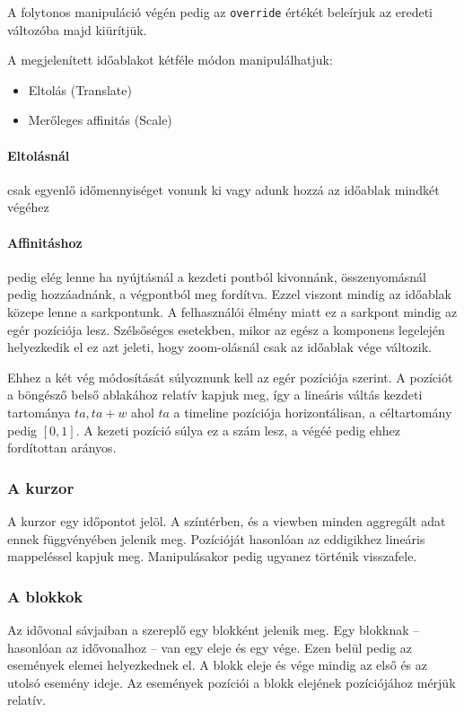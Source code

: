 A folytonos manipuláció végén pedig az \lstinline[columns=fixed]{override} értékét beleírjuk az eredeti változóba majd kiürítjük.


A megjelenített időablakot kétféle módon manipulálhatjuk:

\begin{itemize}
	\item Eltolás (Translate)
	\item Merőleges affinitás (Scale)
\end{itemize}

\paragraph{Eltolásnál} csak egyenlő időmennyiséget vonunk ki vagy adunk hozzá az időablak mindkét végéhez

\paragraph{Affinitáshoz} pedig elég lenne ha nyújtásnál a kezdeti pontból kivonnánk, összenyomásnál pedig hozzáadnánk, a végpontból meg fordítva. Ezzel viszont mindig az időablak közepe lenne a sarkpontunk. A felhasználói élmény miatt ez a sarkpont mindig az egér pozíciója lesz. Szélsőséges esetekben, mikor az egész a komponens legelején helyezkedik el ez azt jeleti, hogy zoom-olásnál csak az időablak vége változik.

Ehhez a két vég módosítását súlyoznunk kell az egér pozíciója szerint. A pozíciót a böngésző belső ablakához relatív kapjuk meg, így a lineáris váltás kezdeti tartománya ${ta, ta + w}$ ahol $ta$ a timeline pozíciója horizontálisan, a céltartomány pedig $[0, 1]$. A kezeti pozíció súlya ez a szám lesz, a végéé pedig ehhez fordítottan arányos.

\subsubsection{A kurzor}

A kurzor egy időpontot jelöl. A színtérben, és a viewben minden aggregált adat ennek függvényében jelenik meg. Pozícióját hasonlóan az eddigikhez lineáris mappeléssel kapjuk meg. Manipulásakor pedig ugyanez történik visszafele.

\subsubsection{A blokkok}

Az idővonal sávjaiban a szereplő egy blokként jelenik meg. Egy blokknak -- hasonlóan az idővonalhoz -- van egy eleje és egy vége. Ezen belül pedig az események elemei helyezkednek el. A blokk eleje és vége mindig az első és az utolsó esemény ideje. Az események pozíciói a blokk elejének pozíciójához mérjük relatív.

